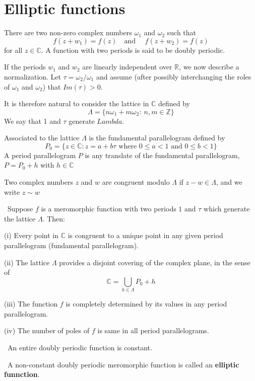 \documentclass[12pt, oneside]{book}
\begin{document}
\section{Elliptic functions}
\begin{definition}
    There are two non-zero complex numbers $\omega_1$ and $\omega_2$ such that
    $$f(z+w_1)=f(z)\quad \text{and }\quad f(z+w_2)=f(z)$$
    for all $z\in\mathbb{C}$. A function with two periods is said to be doubly periodic.

    If the periods $w_1$ and $w_2$ are linearly independent over $\mathbb{R}$, we now describe a normalization. Let $\tau =\omega_2/\omega_1$ and assume (after possibly interchanging the roles of $\omega_1$ and $\omega_2$) that $Im(\tau)>0$.

    It is therefore natural to consider the lattice in $\mathbb{C}$ defined by
    $$\Lambda=\{n\omega_1+m\omega_2:\: n,m\in\mathbb{Z}\}$$
    We say that 1 and $\tau$ generate $Lambda$.

    Associated to the lattice $\Lambda$ is the fundamental parallelogram defined by
    $$P_0=\{z\in\mathbb{C}:z=a+b\tau\text{ where }0\leq a<1\text{ and }0\leq b<1\}$$
    A period parallelogram $P$ is any translate of the
    fundamental parallelogram, $P = P_0 + h$ with $h\in\mathbb{C}$

    Two complex numbers $z$ and $w$ are congruent modulo
    $\Lambda$ if $z-w\in \Lambda$, and we write $z\sim w$
\end{definition}
\begin{proposition}\
    Suppose $f$ is a meromorphic function with two periods
    $1$ and $\tau$ which generate the lattice $\Lambda$. Then:

    (i) Every point in $\mathbb{C}$ is congruent to a unique point in any given period parallelogram (fundamental
    parallelogram).

    (ii) The lattice $\Lambda$ provides a disjoint covering of the complex plane, in the sense of
    $$\mathbb{C}=\bigcup_{h\in\Lambda}P_0+h$$

    (iii) The function $f$ is completely determined by its values in any period parallelogram.

    (iv) The number of poles of $f$ is same in all period parallelograms.
\end{proposition}
\begin{theorem}\
    An entire doubly periodic function is constant.
\end{theorem}
\begin{definition}\
    A non-constant doubly periodic meromorphic function is called an \textbf{elliptic funnction}.
\end{definition}
\end{document}
